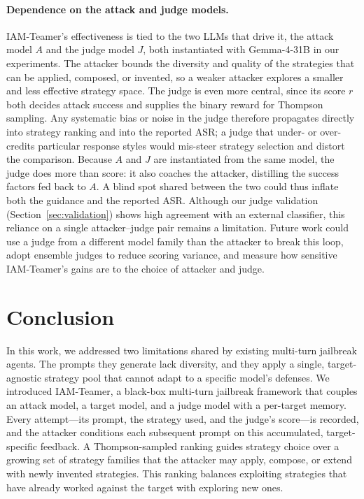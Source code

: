 \documentclass[a4paper,fleqn]{cas-sc}
\begin{document}
\paragraph{Dependence on the attack and judge models.}
IAM-Teamer's effectiveness is tied to the two LLMs that drive it, the attack model $A$ and the judge model $J$, both instantiated with Gemma-4-31B in our experiments.
The attacker bounds the diversity and quality of the strategies that can be applied, composed, or invented, so a weaker attacker explores a smaller and less effective strategy space.
The judge is even more central, since its score $r$ both decides attack success and supplies the binary reward for Thompson sampling. Any systematic bias or noise in the judge therefore propagates directly into strategy ranking and into the reported ASR; a judge that under- or over-credits particular response styles would mis-steer strategy selection and distort the comparison.
Because $A$ and $J$ are instantiated from the same model, the judge does more than score: it also coaches the attacker, distilling the success factors fed back to $A$. A blind spot shared between the two could thus inflate both the guidance and the reported ASR.
Although our judge validation (Section~\ref{sec:validation}) shows high agreement with an external classifier, this reliance on a single attacker--judge pair remains a limitation.
Future work could use a judge from a different model family than the attacker to break this loop, adopt ensemble judges to reduce scoring variance, and measure how sensitive IAM-Teamer's gains are to the choice of attacker and judge.
\section{Conclusion}
\label{sec:conclusion}

In this work, we addressed two limitations shared by existing multi-turn jailbreak agents.
The prompts they generate lack diversity, and they apply a single, target-agnostic strategy pool that cannot adapt to a specific model's defenses.
We introduced IAM-Teamer, a black-box multi-turn jailbreak framework that couples an attack model, a target model, and a judge model with a per-target memory.
Every attempt---its prompt, the strategy used, and the judge's score---is recorded, and the attacker conditions each subsequent prompt on this accumulated, target-specific feedback.
A Thompson-sampled ranking guides strategy choice over a growing set of strategy families that the attacker may apply, compose, or extend with newly invented strategies. This ranking balances exploiting strategies that have already worked against the target with exploring new ones.
\end{document}
